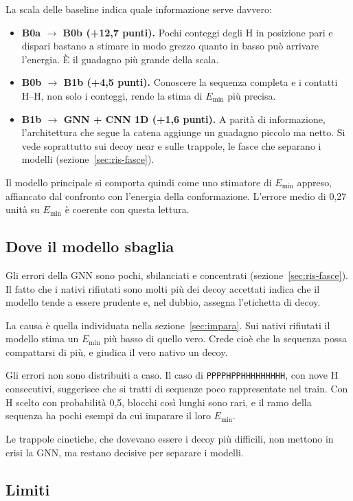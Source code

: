 \documentclass[11pt,a4paper]{article}
\newcommand{\Emin}{E_{\min}}
\begin{document}
La scala delle baseline indica quale informazione serve davvero:
\begin{itemize}
  \item \textbf{B0a $\to$ B0b (+12,7 punti).} Pochi conteggi degli H in posizione pari e dispari bastano a stimare in modo grezzo quanto in basso può arrivare l'energia. È il guadagno più grande della scala.
  \item \textbf{B0b $\to$ B1b (+4,5 punti).} Conoscere la sequenza completa e i contatti H--H, non solo i conteggi, rende la stima di $\Emin$ più precisa.
  \item \textbf{B1b $\to$ GNN + CNN 1D (+1,6 punti).} A parità di informazione, l'architettura che segue la catena aggiunge un guadagno piccolo ma netto. Si vede soprattutto sui decoy near e sulle trappole, le fasce che separano i modelli (sezione~\ref{sec:ris-fasce}).
\end{itemize}

Il modello principale si comporta quindi come uno stimatore di $\Emin$ appreso, affiancato dal confronto con l'energia della conformazione. L'errore medio di 0,27 unità su $\Emin$ è coerente con questa lettura.

\subsection{Dove il modello sbaglia}
\label{sec:errori}

Gli errori della GNN sono pochi, sbilanciati e concentrati (sezione~\ref{sec:ris-fasce}). Il fatto che i nativi rifiutati sono molti più dei decoy accettati indica che il modello tende a essere prudente e, nel dubbio, assegna l'etichetta di decoy.

La causa è quella individuata nella sezione~\ref{sec:impara}. Sui nativi rifiutati il modello stima un $\Emin$ più basso di quello vero. Crede cioè che la sequenza possa compattarsi di più, e giudica il vero nativo un decoy.

Gli errori non sono distribuiti a caso. Il caso di \texttt{PPPPHPPHHHHHHHHH}, con nove H consecutivi, suggerisce che si tratti di sequenze poco rappresentate nel train. Con H scelto con probabilità 0,5, blocchi così lunghi sono rari, e il ramo della sequenza ha pochi esempi da cui imparare il loro $\Emin$.

Le trappole cinetiche, che dovevano essere i decoy più difficili, non mettono in crisi la GNN, ma restano decisive per separare i modelli.

\subsection{Limiti}
\label{sec:limiti}
\end{document}
